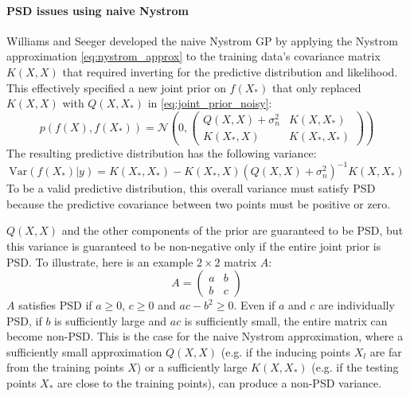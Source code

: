 \paragraph{PSD issues using naive Nystrom}
Williams and Seeger \cite{naive-nystrom} developed the naive Nystrom GP by applying the Nystrom approximation \ref{eq:nystrom_approx} to the training data's covariance matrix $K(X, X)$ that required inverting for the predictive distribution and likelihood. This effectively specified a new joint prior on $f(X_*)$ that only replaced $K(X, X)$ with $Q(X, X_*)$ in \ref{eq:joint_prior_noisy}:
\begin{equation*}
    p(f(X), f(X_*)) = \mathcal{N} \left( 0, 
    \begin{pmatrix}
        Q(X, X) + \sigma_n^2 & K(X, X_*) \\
        K(X_*, X) & K(X_*, X_*)
    \end{pmatrix}
    \right)
\end{equation*}
The resulting predictive distribution has the following variance:
\begin{equation*}
    \text{Var}(f(X_*) | y) = K(X_*, X_*) - K(X_*, X) (Q(X, X) + \sigma_n^2)^{-1} K(X, X_*)
\end{equation*}
To be a valid predictive distribution, this overall variance must satisfy PSD because the predictive covariance between two points must be positive or zero. 

$Q(X, X)$ and the other components of the prior are guaranteed to be PSD, but this variance is guaranteed to be non-negative only if the entire joint prior is PSD. To illustrate, here is an example $2 \times 2$ matrix $A$:
\begin{equation*}
    A =
    \begin{pmatrix}
        a & b \\
        b & c
    \end{pmatrix}
\end{equation*}
$A$ satisfies PSD if $a \geq 0$, $c \geq 0$ and $ac - b^2 \geq 0$. Even if $a$ and $c$ are individually PSD, if $b$ is sufficiently large and $ac$ is sufficiently small, the entire matrix can become non-PSD. This is the case for the naive Nystrom approximation, where a sufficiently small approximation $Q(X, X)$ (e.g. if the inducing points $X_l$ are far from the training points $X$) or a sufficiently large $K(X, X_*)$ (e.g. if the testing points $X_*$ are close to the training points), can produce a non-PSD variance.

